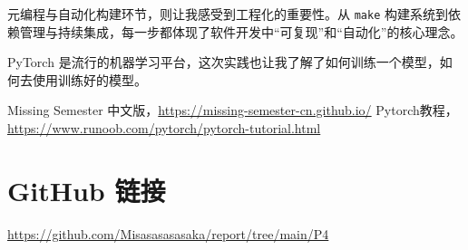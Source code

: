 \documentclass[a4paper,12pt]{ctexart}
\begin{document}
元编程与自动化构建环节，则让我感受到工程化的重要性。从 \texttt{make} 构建系统到依赖管理与持续集成，每一步都体现了软件开发中“可复现”和“自动化”的核心理念。

\vspace{14pt}

PyTorch 是流行的机器学习平台，这次实践也让我了解了如何训练一个模型，如何去使用训练好的模型。

\newpage

\begin{thebibliography}{9}
 Missing Semester 中文版，\url{https://missing-semester-cn.github.io/}
 Pytorch教程，\url{https://www.runoob.com/pytorch/pytorch-tutorial.html}
\end{thebibliography}

\section*{GitHub 链接}
\begin{center}
\href{https://github.com/Misasasasasaka/report/tree/main/P4}{https://github.com/Misasasasasaka/report/tree/main/P4}
\end{center}
\end{document}

